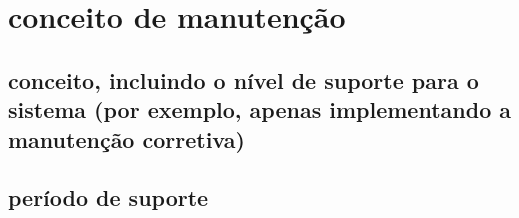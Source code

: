 \chapter{conceito de manutenção}

\section{conceito, incluindo o nível de suporte para o sistema (por exemplo, apenas implementando a manutenção corretiva)}

\section{período de suporte}